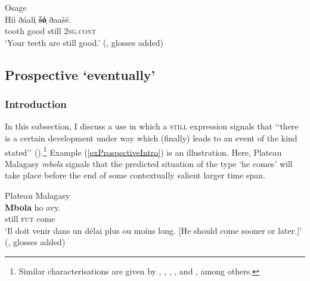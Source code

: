 \begin{exe}
	\ex Osage\label{exAlwaysOsage2}\\
	\gll Híi ðáalí̜ \textbf{šó̜} ðaašé.\\
	tooth good still 2\textsc{sg}.\textsc{cont}\\
	\glt \lq Your teeth are still good.' (\cite[208]{QuinteroDictionary},  glosses added)
\end{exe}
 

\subsection{Prospective \lq eventually\rq}\label{sectionProspective}
\subsubsection[tocentry={}]{Introduction}
In this subsection, I discuss a use in which a \textsc{still} expression signals that \lq\lq there is a certain development under way which (finally) leads to an event of the kind stated\rq\rq{ }(\cite[199–200]{Loebner1989}).\footnote{Similar characterisations are given by \textcite[173]{Ferrand1903}, \textcite[142]{Koenig1991}, \textcite{KoenigTraugott1982}, \textcite[617]{MetrichFaucher2009}, \textcite{Shetter1966} and \textcite{Vaelikangas1982}, among others.} Example (\ref{exProspectiveIntro}) is an illustration. Here, Plateau Malagasy \textit{mbola} signals that the predicted situation of the type \lq he comes\rq{ }will take place before the end of some contextually salient larger time span.
 
\begin{exe}
	\ex Plateau Malagasy\label{exProspectiveIntro}\\
	\gll \textbf{Mbola} ho avy.\\
	still \textsc{fut} come\\
	\glt \lq Il doit venir dans un délai plus ou moins long. [He should come sooner or later.]' (\cite[173]{Ferrand1903}, glosses added)
\end{exe}

